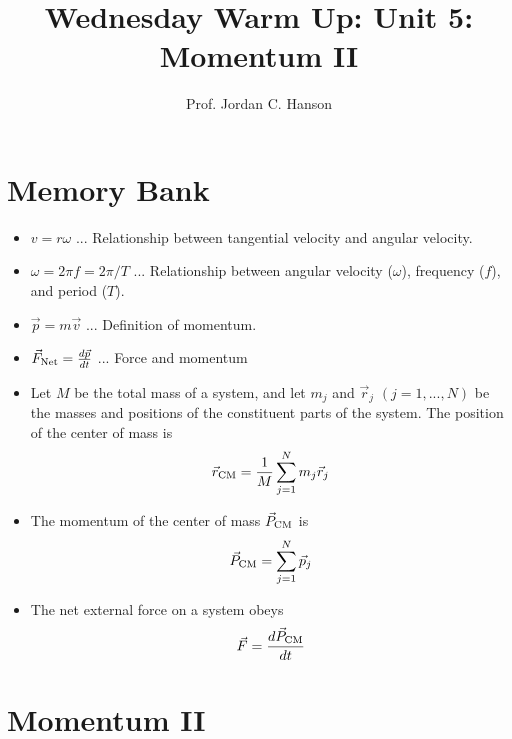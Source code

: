 \documentclass{article}
\begin{document}
\twocolumn

\title{Wednesday Warm Up: Unit 5: Momentum II}
\author{Prof. Jordan C. Hanson}

\maketitle

\section{Memory Bank}

\begin{itemize}
\item $v = r \omega$ ... Relationship between tangential velocity and angular velocity.
\item $\omega = 2\pi f = 2\pi/T$ ... Relationship between angular velocity ($\omega$), frequency ($f$), and period ($T$).
\item $\vec{p} = m\vec{v}$ ... Definition of momentum.
\item $\vec{F}_{\rm Net} = \frac{d\vec{p}}{dt}$ ... Force and momentum
\item Let $M$ be the total mass of a system, and let $m_j$ and $\vec{r}_j$ $(j = 1,...,N)$ be the masses and positions of the constituent parts of the system.  The position of the center of mass is
\begin{equation}
\vec{r}_{\rm CM} = \frac{1}{M}\sum_{j=1}^{N}m_j \vec{r}_j
\end{equation}
\item The momentum of the center of mass $\vec{P}_{\rm CM}$ is
\begin{equation}
\vec{P}_{\rm CM} = \sum_{j=1}^N \vec{p}_j
\end{equation}
\item The net external force on a system obeys
\begin{equation}
\vec{F} = \frac{d\vec{P}_{\rm CM}}{dt}
\end{equation}
\end{itemize}

\section{Momentum II}
\end{document}
